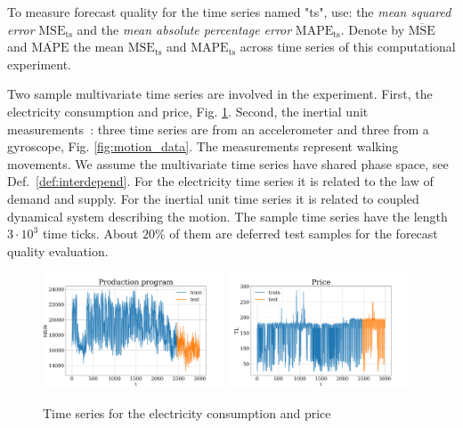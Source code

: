 \documentclass[referee, pdflatex, sn-mathphys-num]{sn-jnl}
\theoremstyle{definition}
\theoremstyle{plain}
\begin{document}
	To measure forecast quality for the time series named "ts", use: the \emph{mean squared error} $ \text{MSE}_{\text{ts}} $ and the \emph{mean absolute percentage error} $ \text{MAPE}_{\text{ts}} $. Denote by $ \overline{\text{MSE}} $ and $ \overline{\text{MAPE}} $ the mean $ \text{MSE}_{\text{ts}} $ and $ \text{MAPE}_{\text{ts}} $ across time series of this computational experiment.
	
	Two sample multivariate time series are involved in the experiment. First, the electricity consumption and price, Fig. \ref{fig:electr_data}. Second, the inertial unit measurements~\cite{accelerometryData}: three time series are from an accelerometer and three from a gyroscope, Fig. \ref{fig:motion_data}. The measurements represent walking movements. We assume the multivariate time series have shared phase space, see Def.~\ref{def:interdepend}. For the electricity time series it is related to the law of demand and supply. For the inertial unit time series it is related to coupled dynamical system describing the motion. The sample time series have the length $ 3 \cdot 10^3 $ time ticks. About $ 20\% $ of them are deferred test samples for the forecast quality evaluation.
	
	\begin{figure}[!htbp]
		\centering
		\includegraphics[width=0.48\textwidth, keepaspectratio]{Electricity_Production}
		\includegraphics[width=0.48\textwidth, keepaspectratio]{Electricity_Price}
		\caption{Time series for the electricity consumption and price}\label{fig:electr_data}
	\end{figure}
	
\end{document}
